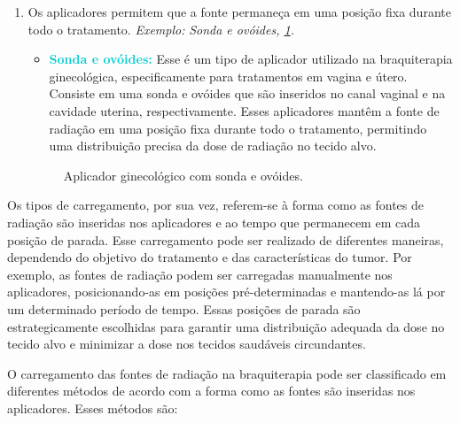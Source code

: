\documentclass[11pt,a4paper]{article}
\newcounter{exemplo}
\begin{document}
\begin{enumerate}
				\item Os aplicadores permitem que a fonte permaneça em uma posição fixa durante todo o tratamento. \textit{\textcolor{CarnationPink}{Exemplo:}} \textit{Sonda e ovóides,    \ref{img:aplicadorSondaEOvoides}.}
				
					\begin{itemize}[label=\textcolor{CarnationPink}{$\star$}]
						\item \textcolor{DarkTurquoise}{\textbf{Sonda e ovóides:}} Esse é um tipo de aplicador utilizado na braquiterapia ginecológica, especificamente para tratamentos em vagina e útero. Consiste em uma sonda e ovóides que são inseridos no canal vaginal e na cavidade uterina, respectivamente. Esses aplicadores mantêm a fonte de radiação em uma posição fixa durante todo o tratamento, permitindo uma distribuição precisa da dose de radiação no tecido alvo.
					\end{itemize}
					\begin{figure}[h]
						\centering
						\caption{Aplicador ginecológico com sonda e ovóides.}
						\label{img:aplicadorSondaEOvoides}
					\end{figure}
			\end{enumerate}
				

			Os tipos de carregamento, por sua vez, referem-se à forma como as fontes de radiação são inseridas nos aplicadores e ao tempo que permanecem em cada posição de parada. Esse carregamento pode ser realizado de diferentes maneiras, dependendo do objetivo do tratamento e das características do tumor. Por exemplo, as fontes de radiação podem ser carregadas manualmente nos aplicadores, posicionando-as em posições pré-determinadas e mantendo-as lá por um determinado período de tempo. Essas posições de parada são estrategicamente escolhidas para garantir uma distribuição adequada da dose no tecido alvo e minimizar a dose nos tecidos saudáveis circundantes.

			O carregamento das fontes de radiação na braquiterapia pode ser classificado em diferentes métodos de acordo com a forma como as fontes são inseridas nos aplicadores. Esses métodos são:
\end{document}

